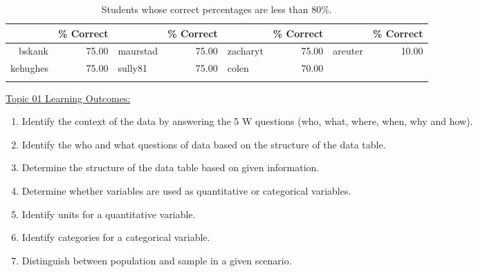 \documentclass[12pt,english,nohyper]{tufte-handout}\usepackage[]{graphicx}\usepackage[]{color}
\begin{document}
\begin{fullwidth}
\makeatletter\setlength\hsize{\@tufte@fullwidth}\makeatother
\begin{longtable}{rr|lr|lr|lr}
  \hline
  & \% Correct &   & \% Correct &   & \% Correct &   & \% Correct \\ 
  \hline
bskank & 75.00 & maurstad & 75.00 & zacharyt & 75.00 & areuter & 10.00 \\ 
  kehughes & 75.00 & sully81 & 75.00 & colen & 70.00 &  &  \\ 
   \hline
\hline
\caption{Students whose correct percentages are less than 80\%.} 
\label{tab:studentsbelow80}
\end{longtable}

\end{fullwidth}



\vspace{-2mm}

\noindent
\underline{Topic 01 Learning Outcomes:}
\vspace{2mm}

\begin{fullwidth}
\begin{enumerate}[label=\Alph*.,itemsep=-\parsep,leftmargin=*]
  \item
Identify the context of the data by answering the 5 W questions (who, what, where, when, why and how).
\item Identify the who and what questions of data based on the structure of the data table.
\item Determine the structure of the data table based on given information.
\item Determine whether variables are used as quantitative or categorical variables.
\item Identify units for a quantitative variable.
\item Identify categories for a categorical variable.
\item Distinguish between population and sample in a given scenario.

\end{enumerate}
\end{fullwidth}



\vspace{5mm}
\end{document}

